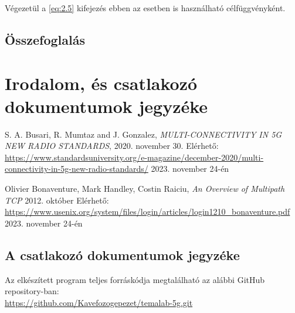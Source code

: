 \documentclass[a4paper,oneside]{article}
\begin{document}
Végezetül a \eqref{eq:2.5} kifejezés ebben az esetben is használható célfüggvényként.



\newpage

\subsection{Összefoglalás}
\label{sec:osszefoglalas}

\newpage
 
\section{Irodalom, és csatlakozó dokumentumok jegyzéke}
\label{sec:irod-es-csatl}

\begin{thebibliography}{9}
\label{sec:tanulm-irod-jegyz}

 S. A. Busari, R. Mumtaz and J. Gonzalez,
\emph{MULTI-CONNECTIVITY IN 5G NEW RADIO STANDARDS},
2020. november 30.
Elérhető: \url{https://www.standardsuniversity.org/e-magazine/december-2020/multi-connectivity-in-5g-new-radio-standards/}
2023. november 24-én

 Olivier Bonaventure, Mark Handley, Costin Raiciu,
\emph{An Overview of Multipath TCP}
2012. október
Elérhető: \url{https://www.usenix.org/system/files/login/articles/login1210_bonaventure.pdf}
2023. november 24-én

\end{thebibliography}

\subsection{A csatlakozó dokumentumok jegyzéke}
\label{sec:csat-irod}

Az elkészített program teljes forráskódja megtalálható az alábbi GitHub repository-ban:\\
\href{https://github.com/Kavefozogepezet/temalab-5g.git}{https://github.com/Kavefozogepezet/temalab-5g.git}
\end{document}
